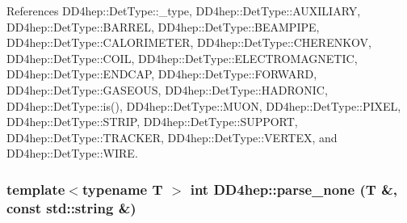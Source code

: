 References DD4hep::DetType::\_\-type, DD4hep::DetType::AUXILIARY, DD4hep::DetType::BARREL, DD4hep::DetType::BEAMPIPE, DD4hep::DetType::CALORIMETER, DD4hep::DetType::CHERENKOV, DD4hep::DetType::COIL, DD4hep::DetType::ELECTROMAGNETIC, DD4hep::DetType::ENDCAP, DD4hep::DetType::FORWARD, DD4hep::DetType::GASEOUS, DD4hep::DetType::HADRONIC, DD4hep::DetType::is(), DD4hep::DetType::MUON, DD4hep::DetType::PIXEL, DD4hep::DetType::STRIP, DD4hep::DetType::SUPPORT, DD4hep::DetType::TRACKER, DD4hep::DetType::VERTEX, and DD4hep::DetType::WIRE.\hypertarget{namespace_d_d4hep_a471f0d790f1e1007734b4d73fdf1fd87}{
\subsubsection[{parse\_\-none}]{\setlength{\rightskip}{0pt plus 5cm}template$<$typename T $>$ int DD4hep::parse\_\-none ({\bf T} \&, \/  const std::string \&)}}
\label{namespace_d_d4hep_a471f0d790f1e1007734b4d73fdf1fd87}


